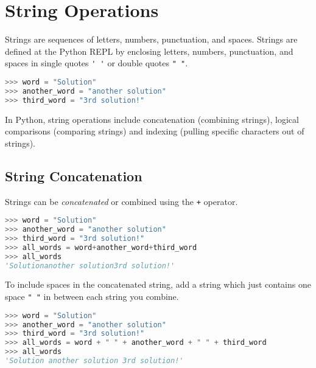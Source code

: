 \documentclass{book}
\newcommand{\passthrough}[1]{#1}
\begin{document}
    
        \hypertarget{string-operations}{%
\section{String Operations}\label{string-operations}}
    




    
        Strings are sequences of letters, numbers, punctuation, and spaces.
Strings are defined at the Python REPL by enclosing letters, numbers,
punctuation, and spaces in single quotes \passthrough{\lstinline!' '!}
or double quotes \passthrough{\lstinline!" "!}.

\begin{lstlisting}[language=Python]
>>> word = "Solution"
>>> another_word = "another solution"
>>> third_word = "3rd solution!"
\end{lstlisting}

In Python, string operations include concatenation (combining strings),
logical comparisons (comparing strings) and indexing (pulling specific
characters out of strings).
    




    
        \hypertarget{string-concatenation}{%
\subsection{String Concatenation}\label{string-concatenation}}
    




    
        Strings can be \emph{concatenated} or combined using the
\passthrough{\lstinline!+!} operator.

\begin{lstlisting}[language=Python]
>>> word = "Solution"
>>> another_word = "another solution"
>>> third_word = "3rd solution!"
>>> all_words = word+another_word+third_word
>>> all_words
'Solutionanother solution3rd solution!'
\end{lstlisting}

To include spaces in the concatenated string, add a string which just
contains one space \passthrough{\lstinline!" "!} in between each string
you combine.

\begin{lstlisting}[language=Python]
>>> word = "Solution"
>>> another_word = "another solution"
>>> third_word = "3rd solution!"
>>> all_words = word + " " + another_word + " " + third_word
>>> all_words
'Solution another solution 3rd solution!'
\end{lstlisting}
    
\end{document}
